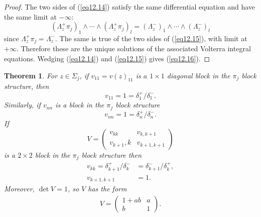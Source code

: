 \documentclass{surv-l}
\theoremstyle{plain}
\newtheorem{theorem}{Theorem}[section]
\theoremstyle{definition}
\numberwithin{equation}{chapter}
\begin{document}
\begin{proof}
The two sides of (\ref{eq12.14}) satisfy the same differential equation and have the same limit at $-\infty$:
\begin{equation*}
(\Lambda_{z}^{+}\pi_{j})_{1}\wedge\cdots \wedge(\Lambda_{z}^{+}\pi_{j})_{l}=(\Lambda_{z}^{-})_{1}\wedge\cdots \wedge(\Lambda_{z}^{-})_{l}
\end{equation*}
since $\Lambda_{z}^{+}\pi_{j}=\Lambda_{z}^{-}$. The same is true of the two sides of (\ref{eq12.15}), with limit at $+\infty$. Therefore these are the unique solutions of the associated Volterra integral equations. Wedging (\ref{eq12.14}) and (\ref{eq12.15}) gives (\ref{eq12.16}).
\end{proof}
\setcounter{theorem}{16}
\begin{theorem}\label{thm12.17}
For $z\in\Sigma_{j}$, if $v_{11}=v(z)_{11}$ is $a$  $1 \times 1$ diagonal block in the $\pi_{j}$ block structure, then
\setcounter{equation}{17}
\begin{equation}\label{eq12.18}
v_{11}=1=\delta_{1}^{+}/\delta_{1}^{-}.
\end{equation}
Similarly, if $v_{nn}$ is a block in the $\pi_{j}$ block structure
\begin{equation}\label{eq12.19}
v_{nn}=1=\delta_{n}^{+}/\delta_{n}^{-}.
\end{equation}
If
\begin{equation}\label{eq12.20}
V=\left(\begin{array}{cc}
v_{kk} & v_{k,k+1}\\
v_{k+1},k & v_{k+1,k+1}
\end{array}\right)
\end{equation}
is a $2\times 2$ block in the $\pi_{j}$ block structure then
\begin{align}\label{eq12.21}
v_{kk}=\delta_{k+1}^{+}/\delta_{k}^{-}&=\delta_{k+1}^{-}/\delta_{k}^{+},\\
v_{{k+1}, k+1}&=1.
\end{align}
Moreover, $\det V=1$, so $V$ has the form
\begin{align}\label{eq12.23}
V=\left(\begin{array}{cc}
1+ab & a\\
b & 1
\end{array}\right).
\end{align}
\end{theorem}
\end{document}
